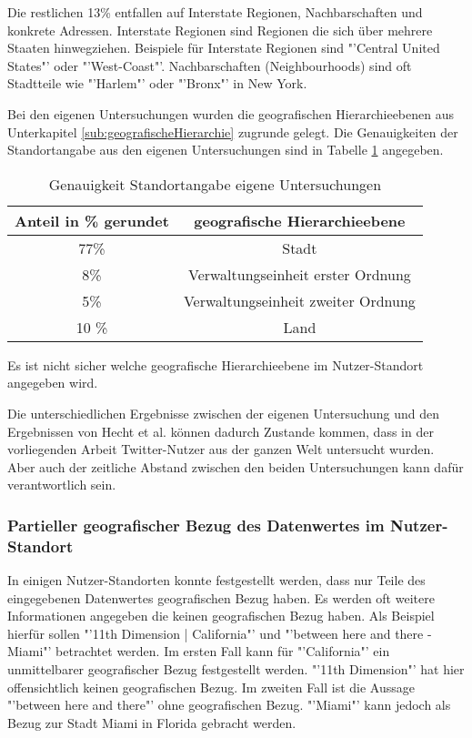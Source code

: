				Die restlichen 13\% entfallen auf Interstate Regionen, Nachbarschaften und konkrete Adressen. 
				Interstate Regionen sind Regionen die sich über mehrere Staaten hinwegziehen. 
				Beispiele für Interstate Regionen sind "'Central United States"' oder "'West-Coast"'.
				Nachbarschaften (Neighbourhoods) sind oft Stadtteile wie "'Harlem"' oder "'Bronx"' in New York.

				Bei den eigenen Untersuchungen wurden die geografischen Hierarchieebenen aus Unterkapitel \ref{sub:geografischeHierarchie} zugrunde gelegt.
				Die Genauigkeiten der Standortangabe aus den eigenen Untersuchungen sind in Tabelle \ref{tab:genauigkeitenEigene} angegeben.

				\begin{table}[htpb]
				\caption{Genauigkeit Standortangabe eigene Untersuchungen} 
				\centering
				\begin{tabular}{|c||c|}
					\hline
					Anteil in \% gerundet & geografische Hierarchieebene \\
					\hline\hline
					77\% & Stadt \\
					\hline
					8\% & Verwaltungseinheit erster Ordnung  \\
					\hline
					5\% & Verwaltungseinheit zweiter Ordnung  \\
					\hline
					10 \% & Land \\
					\hline
				\end{tabular}
				\label{tab:genauigkeitenEigene} 
				\end{table} 

				Es ist nicht sicher welche geografische Hierarchieebene im Nutzer-Standort angegeben wird. 

				Die unterschiedlichen Ergebnisse zwischen der eigenen Untersuchung und den Ergebnissen von Hecht et al. können dadurch Zustande kommen, dass in der vorliegenden Arbeit Twitter-Nutzer aus der ganzen Welt untersucht wurden.
				Aber auch der zeitliche Abstand zwischen den beiden Untersuchungen kann dafür verantwortlich sein.  



			\subsubsection{Partieller geografischer Bezug des Datenwertes im Nutzer-Standort} \label{subsec:partiellerGeografischerBezug} 

				In einigen Nutzer-Standorten konnte festgestellt werden, dass nur Teile des eingegebenen Datenwertes geografischen Bezug haben. 
				Es werden oft weitere Informationen angegeben die keinen geografischen Bezug haben. 
				Als Beispiel hierfür sollen "'11th Dimension | California"' und "'between here and there - Miami"' betrachtet werden.
				Im ersten Fall kann für "'California"' ein unmittelbarer geografischer Bezug festgestellt werden.
				"'11th Dimension"' hat hier offensichtlich keinen geografischen Bezug.
				Im zweiten Fall ist die Aussage "'between here and there"' ohne geografischen Bezug.
				"'Miami"' kann jedoch als Bezug zur Stadt Miami in Florida gebracht werden.
				
